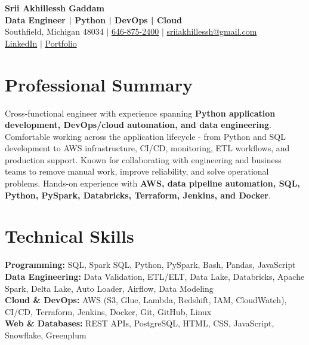 \documentclass[letterpaper,10pt]{article}
\begin{document}
\fontsize{9.35pt}{10.45pt}\selectfont

\begin{center}
    {\LARGE \textbf{Srii Akhillessh Gaddam}} \\[-1pt]
    \textbf{Data Engineer | Python | DevOps | Cloud} \\[2pt]
    Southfield, Michigan 48034 $|$
    \href{tel:6468752400}{646-875-2400} $|$
    \href{mailto:sriiakhillessh@gmail.com}{sriiakhillessh@gmail.com} \\[1pt]
    \href{https://www.linkedin.com/in/srii-akhiilessh-gaddam-b48668191/}{LinkedIn} $|$
    \href{https://sriiakhillesshg.github.io/portfolio/}{Portfolio}
\end{center}
\vspace{-8pt}

\section{Professional Summary}
\small{Cross-functional engineer with experience spanning \textbf{Python application development, DevOps/cloud automation, and data engineering}. Comfortable working across the application lifecycle - from Python and SQL development to AWS infrastructure, CI/CD, monitoring, ETL workflows, and production support. Known for collaborating with engineering and business teams to remove manual work, improve reliability, and solve operational problems. Hands-on experience with \textbf{AWS, data pipeline automation, SQL, Python, PySpark, Databricks, Terraform, Jenkins, and Docker}.}

\section{Technical Skills}
\small{
\textbf{Programming:} SQL, Spark SQL, Python, PySpark, Bash, Pandas, JavaScript \\
\textbf{Data Engineering:} Data Validation, ETL/ELT, Data Lake, Databricks, Apache Spark, Delta Lake, Auto Loader, Airflow, Data Modeling \\
\textbf{Cloud \& DevOps:} AWS (S3, Glue, Lambda, Redshift, IAM, CloudWatch), CI/CD, Terraform, Jenkins, Docker, Git, GitHub, Linux \\
\textbf{Web \& Databases:} REST APIs, PostgreSQL, HTML, CSS, JavaScript, Snowflake, Greenplum
}
\end{document}
